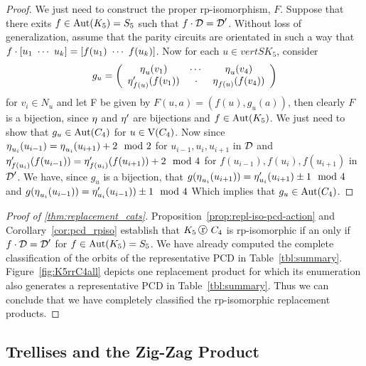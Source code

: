 \begin{proof}

We just need to construct the proper rp-isomorphism, $F$. Suppose that there exits $f \in \operatorname{\mathrm{Aut}}(K_5) = S_5$ such that $f \cdot \operatorname{\mathcal{D}} = \operatorname{\mathcal{D}}^{\prime}$. Without loss of generalization, assume that the parity circuits are orientated in such a way that $f \cdot \left[u_1 \ \cdots\ u_k\right]  = \left[f(u_1)\ \cdots\ f(u_k) \right]$. Now for each $u \in vertS{K_5}$, consider \[ g_u = \left(
  \begin{array}{ccc}
    \operatorname{\eta}_{u}(v_1) & \cdots & \operatorname{\eta}_{u}(v_4) \\
    \operatorname{\eta}^{\prime}_{f(u)}(f(v_1)) & \cdot & \operatorname{\eta}_{f(u)}(f(v_4))
  \end{array}
\right) \]
for $v_i \in N_{u}$ and let F be given by $F(u,a) = (f(u), g_u(a))$, then clearly $F$ is a bijection, since $\operatorname{\eta}$ and $\operatorname{\eta}^{\prime}$ are bijections and $f \in \operatorname{\mathrm{Aut}}(K_5)$. We just need to show that $g_u \in \operatorname{\mathrm{Aut}}(C_4)$ for $u \in \mathrm{V}(C_4)$.  Now since $\operatorname{\eta}_{u_{i}}(u_{i-1}) = \operatorname{\eta}_{u_i}(u_{i+1}) + 2 \mod{2}$ for $u_{i-1}, u_{i}, u_{i+1}$ in $\operatorname{\mathcal{D}}$ and $\operatorname{\eta}^{\prime}_{f(u_i)}(f(u_{i-1})) = \operatorname{\eta}^{\prime}_{f(u_i)}(f(u_{i+1})) + 2 \mod{4}$ for  $f(u_{i-1}), f(u_{i}), f(u_{i+1})$ in $\operatorname{\mathcal{D}}^{\prime}$. We have, since $g_{u}$ is a bijection, that $g( \operatorname{\eta}_{u_i}(u_{i+1}) ) = \operatorname{\eta}^{\prime}_{u_i}(u_{i+1}) \pm 1 \mod{4}$ and $g( \operatorname{\eta}_{u_i}(u_{i-1}) ) = \operatorname{\eta}^{\prime}_{u_i}(u_{i-1})) \pm 1 \mod{4}$ Which implies that $g_{u} \in \operatorname{\mathrm{Aut}}(C_4)$.
\end{proof}

\begin{proof}[Proof of \ref{thm:replacement_cats}]
Proposition~\ref{prop:repl-iso-pcd-action} and Corollary~\ref{cor:pcd_rpiso} establish that $K_5 \replacement C_4$ is rp-isomorphic if an only if $f \cdot \operatorname{\mathcal{D}} = \operatorname{\mathcal{D}}^{\prime}$ for $f \in \operatorname{\mathrm{Aut}}(K_5) = S_5$. We have already computed the complete classification of the orbits of the representative PCD in Table~\ref{tbl:summary}.  Figure~\ref{fig:K5rrC4all} depicts one replacement product for which its enumeration also generates a representative PCD in Table~\ref{tbl:summary}. Thus we can conclude that we have completely classified the rp-isomorphic replacement products.    
\end{proof}

\subsection{Trellises and the Zig-Zag Product}
\label{sec:trellises-zig-zag}

